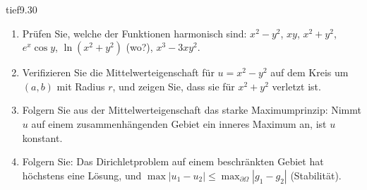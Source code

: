 \begin{karte}{tief}{9.30}{\typtypisch}{}
\begin{enumerate}[label=(\alph*),leftmargin=1.6em,itemsep=2pt]
\item Prüfen Sie, welche der Funktionen harmonisch sind: $x^{2} - y^{2}$, $xy$, $x^{2} + y^{2}$, $e^{x}\cos y$, $\ln(x^{2} + y^{2})$ (wo?), $x^{3} - 3xy^{2}$.
\item Verifizieren Sie die Mittelwerteigenschaft für $u = x^{2} - y^{2}$ auf dem Kreis um $(a, b)$ mit Radius $r$, und zeigen Sie, dass sie für $x^{2} + y^{2}$ verletzt ist.
\item Folgern Sie aus der Mittelwerteigenschaft das starke Maximumprinzip: Nimmt $u$ auf einem zusammenhängenden Gebiet ein inneres Maximum an, ist $u$ konstant.
\item Folgern Sie: Das Dirichletproblem auf einem beschränkten Gebiet hat höchstens eine Lösung, und $\max|u_1 - u_2|\le\max_{\partial\Omega}|g_1 - g_2|$ (Stabilität).
\end{enumerate}
\end{karte}


